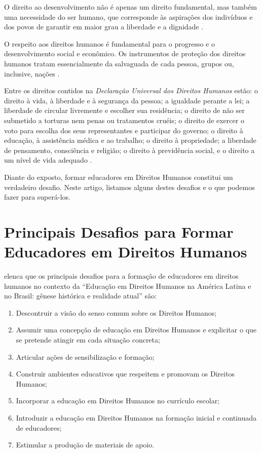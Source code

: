 \documentclass[
	article,			%
	11pt,				%
	oneside,			%
	a4paper,			%
	english,			%
	brazil,				%
	sumario=tradicional
]{abntex2}
\begin{document}
\noindent
O direito ao desenvolvimento não é apenas um direito fundamental, mas também uma
necessidade do ser humano, que corresponde às aspirações dos indivíduos e dos
povos de garantir em maior grau a liberdade e a dignidade
\cite{RAYO2004}.

\noindent
O respeito aos direitos humanos é fundamental para o progresso e o
desenvolvimento social e econômico. Os instrumentos de proteção dos direitos
humanos tratam essencialmente da salvaguada de cada pessoa, grupos ou,
inclusive, nações \cite{RAYO2004}.

\noindent
Entre os direitos contidos na \textit{Declaração Universal dos Direitos Humanos}
estão: o direito à vida, à liberdade e à segurança da pessoa; a igualdade
perante a lei; a liberdade de circular livremente e escolher sua residência; o
direito de não ser submetido a torturas nem penas ou tratamentos cruéis; o
direito de exercer o voto para escolha dos seus representantes e participar do
governo; o direito à educação, à assistência médica e ao trabalho; o direito à
propriedade; a liberdade de pensamento, consciência e religião; o direito à
previdência social, e o direito a um nível de vida adequado
\cite{ONU1948}.

\noindent
Diante do exposto, formar educadores em Direitos Humanos constitui um verdadeiro
desafio. Neste artigo, listamos alguns destes desafios e o que podemos fazer
para superá-los.

\section{Principais Desafios para Formar Educadores em Direitos Humanos}

 elenca que os principais desafios para a formação de
educadores em direitos humanos no contexto da ``Educação em Direitos Humanos na
América Latina e no Brasil: gênese histórica e realidade atual'' são:

\begin{enumerate}
	\item Descontruir a visão do senso comum sobre os Direitos Humanos;
	\item Assumir uma concepção de educação em Direitos Humanos e explicitar
		  o que se pretende atingir em cada situação concreta;
	\item Articular ações de sensibilização e formação;
	\item Construir ambientes educativos que respeitem e promovam os Direitos
		  Humanos;
	\item Incorporar a educação em Direitos Humanos no currículo escolar;
	\item Introduzir a educação em Direitos Humanos na formação inicial e
		  continuada de educadores;
	\item Estimular a produção de materiais de apoio.
\end{enumerate}
\end{document}
